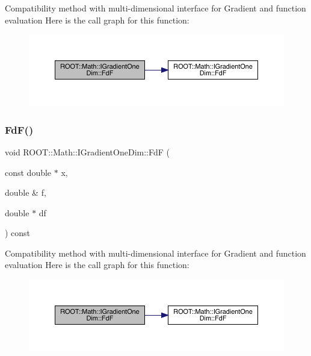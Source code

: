 Compatibility method with multi-\/dimensional interface for Gradient and function evaluation Here is the call graph for this function\+:
\nopagebreak
\begin{figure}[H]
\begin{center}
\leavevmode
\includegraphics[width=350pt]{da/d8e/classROOT_1_1Math_1_1IGradientOneDim_a4d51d8a5bfdb547348b6da33008f6a9e_cgraph}
\end{center}
\end{figure}
\mbox{\label{classROOT_1_1Math_1_1IGradientOneDim_a4d51d8a5bfdb547348b6da33008f6a9e}} 
\subsubsection{\texorpdfstring{FdF()}{FdF()}\hspace{0.1cm}{\footnotesize\ttfamily [6/6]}}
{\footnotesize\ttfamily void R\+O\+O\+T\+::\+Math\+::\+I\+Gradient\+One\+Dim\+::\+FdF (\begin{DoxyParamCaption}\item[{const double $\ast$}]{x,  }\item[{double \&}]{f,  }\item[{double $\ast$}]{df }\end{DoxyParamCaption}) const\hspace{0.3cm}{\ttfamily [inline]}}

Compatibility method with multi-\/dimensional interface for Gradient and function evaluation Here is the call graph for this function\+:
\nopagebreak
\begin{figure}[H]
\begin{center}
\leavevmode
\includegraphics[width=350pt]{da/d8e/classROOT_1_1Math_1_1IGradientOneDim_a4d51d8a5bfdb547348b6da33008f6a9e_cgraph}
\end{center}
\end{figure}
\mbox{\label{classROOT_1_1Math_1_1IGradientOneDim_ac00c2cdc7a93ea4358f2f1df8e3499eb}} 
